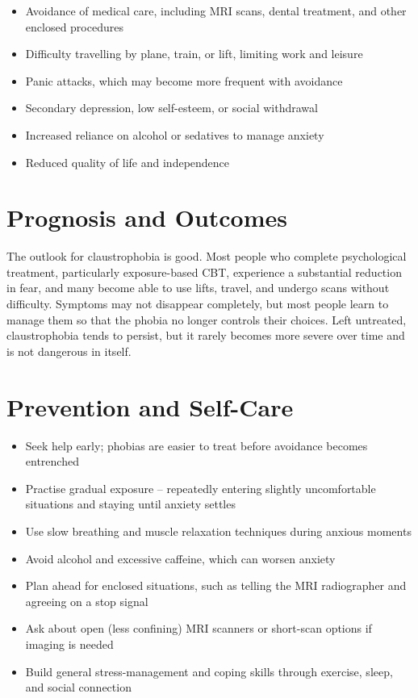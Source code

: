 \begin{itemize}
    \item Avoidance of medical care, including MRI scans, dental treatment, and other enclosed procedures
    \item Difficulty travelling by plane, train, or lift, limiting work and leisure
    \item Panic attacks, which may become more frequent with avoidance
    \item Secondary depression, low self-esteem, or social withdrawal
    \item Increased reliance on alcohol or sedatives to manage anxiety
    \item Reduced quality of life and independence
\end{itemize}

\section*{Prognosis and Outcomes}
The outlook for claustrophobia is good. Most people who complete psychological treatment, particularly exposure-based CBT, experience a substantial reduction in fear, and many become able to use lifts, travel, and undergo scans without difficulty. Symptoms may not disappear completely, but most people learn to manage them so that the phobia no longer controls their choices. Left untreated, claustrophobia tends to persist, but it rarely becomes more severe over time and is not dangerous in itself.

\section*{Prevention and Self-Care}
\begin{itemize}
    \item Seek help early; phobias are easier to treat before avoidance becomes entrenched
    \item Practise gradual exposure -- repeatedly entering slightly uncomfortable situations and staying until anxiety settles
    \item Use slow breathing and muscle relaxation techniques during anxious moments
    \item Avoid alcohol and excessive caffeine, which can worsen anxiety
    \item Plan ahead for enclosed situations, such as telling the MRI radiographer and agreeing on a stop signal
    \item Ask about open (less confining) MRI scanners or short-scan options if imaging is needed
    \item Build general stress-management and coping skills through exercise, sleep, and social connection
\end{itemize}
